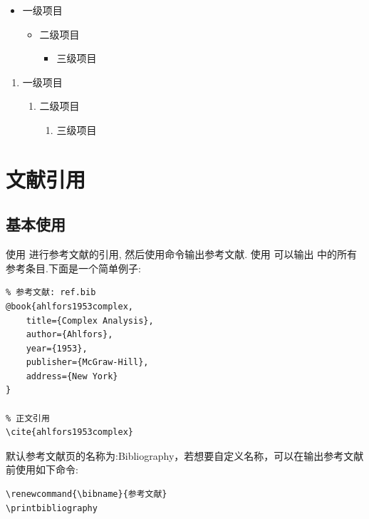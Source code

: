 \begin{multicols}{2}
    \begin{itemize}
        \item 一级项目
        \begin{itemize}
            \item 二级项目
            \begin{itemize}
                \item 三级项目
            \end{itemize}
        \end{itemize}
    \end{itemize}
    
    \begin{enumerate}
        \item 一级项目
        \begin{enumerate}
            \item 二级项目
            \begin{enumerate}
                \item 三级项目
            \end{enumerate}
        \end{enumerate}
    \end{enumerate}
\end{multicols}


\section{文献引用}
\subsection{基本使用}
使用  进行参考文献的引用, 然后使用命令\cmd{\printbibliography}输出参考文献.
使用\cmd{\nocite{*}} 可以输出  中的所有参考条目.下面是一个简单例子:

\begin{verbatim}
% 参考文献: ref.bib
@book{ahlfors1953complex,
    title={Complex Analysis},
    author={Ahlfors},
    year={1953},
    publisher={McGraw-Hill},
    address={New York}
}

% 正文引用
\cite{ahlfors1953complex}
\end{verbatim}

默认参考文献页的名称为:Bibliography，若想要自定义名称，可以在输出参考文献前使用如下命令:
\begin{verbatim}
\renewcommand{\bibname}{参考文献}
\printbibliography
\end{verbatim}

